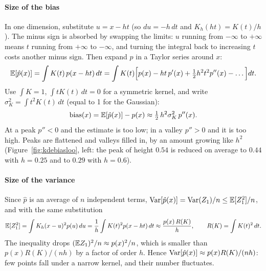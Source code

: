 \documentclass[11pt]{article}
\begin{document}
\paragraph{Size of the bias} In one dimension, substitute $u = x - ht$ (so $du = -h\,dt$ and
$K_h(ht) = K(t)/h$). The minus sign is absorbed by swapping the limits: $u$ running from $-\infty$ to $+\infty$ means
$t$ running from $+\infty$ to $-\infty$, and turning the integral back to increasing $t$ costs another minus sign.
Then expand $p$ in a Taylor series around $x$:
\[
  \mathbb{E}[\hat p(x)] = \int K(t)\, p(x - ht)\, dt
  = \int K(t) \Big[ p(x) - ht\, p'(x) + \tfrac{1}{2} h^2 t^2 p''(x) - \dots \Big] dt .
\]
Use $\int K = 1$, $\int t K(t)\, dt = 0$ for a symmetric kernel, and write $\sigma_K^2 = \int t^2 K(t)\, dt$ (equal to 1
for the Gaussian):
\[
  \operatorname{bias}(x) = \mathbb{E}[\hat p(x)] - p(x) \approx \tfrac{1}{2}\, h^2 \sigma_K^2\, p''(x) .
\]
At a peak $p'' < 0$ and the estimate is too low; in a valley $p'' > 0$ and it is too high. Peaks are flattened and
valleys filled in, by an amount growing like $h^2$ (Figure~\ref{fig:kdebiasloo}, left: the peak of height $0.54$ is
reduced on average to $0.44$ with $h = 0.25$ and to $0.29$ with $h = 0.6$).

\paragraph{Size of the variance} Since $\hat p$ is an average of $n$ independent terms,
$\operatorname{Var}[\hat p(x)] = \operatorname{Var}(Z_1)/n \le \mathbb{E}[Z_1^2]/n$, and with the same substitution
\[
  \mathbb{E}[Z_1^2] = \int K_h(x - u)^2 p(u)\, du = \frac{1}{h} \int K(t)^2 p(x - ht)\, dt \approx \frac{p(x)\, R(K)}{h},
  \qquad R(K) = \int K(t)^2\, dt .
\]
The inequality drops $(\mathbb{E} Z_1)^2/n \approx p(x)^2/n$, which is smaller than $p(x)R(K)/(nh)$ by a factor of order
$h$. Hence $\operatorname{Var}[\hat p(x)] \approx p(x) R(K)/(nh)$: few points fall under a narrow kernel, and their number
fluctuates.
\end{document}

